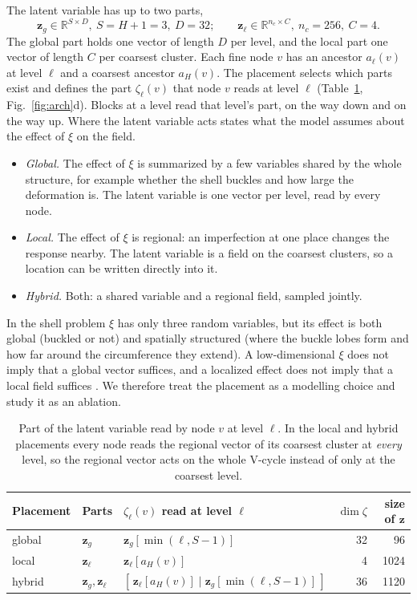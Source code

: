 \documentclass[preprint,12pt]{elsarticle}
\newcommand{\R}{\mathbb{R}}
\newcommand{\zg}{\mathbf{z}_{g}}
\newcommand{\zl}{\mathbf{z}_{\ell}}
\newcommand{\bz}{\mathbf{z}}
\begin{document}
The latent variable has up to two parts,
\begin{equation}
  \zg\in\R^{S\times D},\ S=H+1=3,\ D=32;\qquad
  \zl\in\R^{n_c\times C},\ n_c=256,\ C=4 .
\end{equation}
The global part holds one vector of length $D$ per level, and the local part one vector of length
$C$ per coarsest cluster. Each fine node $v$ has an ancestor $a_\ell(v)$ at level $\ell$ and a
coarsest ancestor $a_H(v)$. The placement selects which parts exist and defines the part
$\zeta_\ell(v)$ that node $v$ reads at level $\ell$ (Table~\ref{tab:placement}, Fig.~\ref{fig:arch}d). Blocks at a level
read that level's part, on the way down and on the way up. Where the latent variable acts states
what the model assumes about the effect of $\xi$ on the field.
\begin{itemize}
\item \emph{Global.} The effect of $\xi$ is summarized by a few variables shared by the whole
  structure, for example whether the shell buckles and how large the deformation is. The latent
  variable is one vector per level, read by every node.
\item \emph{Local.} The effect of $\xi$ is regional: an imperfection at one place changes the
  response nearby. The latent variable is a field on the coarsest clusters, so a location can be
  written directly into it.
\item \emph{Hybrid.} Both: a shared variable and a regional field, sampled jointly.
\end{itemize}
In the shell problem $\xi$ has only three random variables, but its effect is both global (buckled
or not) and spatially structured (where the buckle lobes form and how far around the
circumference they extend). A low-dimensional $\xi$ does not imply that a global vector suffices,
and a localized effect does not imply that a local field suffices \cite{park2026dll,masuki2026rgfm}.
We therefore treat the placement as a modelling choice and study it as an ablation.

\begin{table}[!htbp]
\centering
\small
\begin{tabular}{@{}lllrr@{}}
\toprule
Placement & Parts & $\zeta_\ell(v)$ read at level $\ell$ & $\dim\zeta$ & size of $\bz$ \\
\midrule
global & $\zg$ & $\zg[\min(\ell,S-1)]$ & 32 & 96 \\
local  & $\zl$ & $\zl[a_H(v)]$ & 4 & 1024 \\
hybrid & $\zg,\zl$ & $[\,\zl[a_H(v)]\mid\zg[\min(\ell,S-1)]\,]$ & 36 & 1120 \\
\bottomrule
\end{tabular}
\caption{Part of the latent variable read by node $v$ at level $\ell$. In the local and hybrid
placements every node reads the regional vector of its coarsest cluster at \emph{every} level, so
the regional vector acts on the whole V-cycle instead of only at the coarsest level.}
\label{tab:placement}
\end{table}
\end{document}
